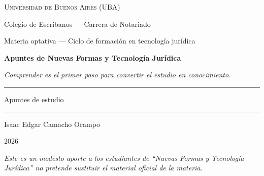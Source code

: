 \documentclass[12pt,oneside]{book}
\newcommand{\universidad}{Universidad de Buenos Aires (UBA)}
\newcommand{\carrera}{Colegio de Escribanos --- Carrera de Notariado}
\newcommand{\materia}{Nuevas Formas y Tecnología Jurídica}
\newcommand{\titulo}{Apuntes de Nuevas Formas y Tecnología Jurídica}
\newcommand{\autor}{Isaac Edgar Camacho Ocampo}
\newcommand{\anio}{2026}
\newcommand{\reflexion}{Comprender es el primer paso para convertir el estudio en conocimiento.}
\begin{document}
\begin{titlepage}

\thispagestyle{empty}

\begin{center}

\vspace*{1cm}

{\large \textsc{\universidad}}

\vspace{0.2cm}

{\large \carrera}

\vspace{0.2cm}

{\normalsize Materia optativa --- Ciclo de formación en tecnología jurídica}

\vspace{3cm}

{\Huge \textbf{\titulo}}

\vspace{1cm}

\textit{\reflexion}

\vspace{1.2cm}

\rule{0.70\textwidth}{0.5pt}

\vspace{0.5cm}

{\large Apuntes de estudio}

\vspace{0.5cm}

\rule{0.70\textwidth}{0.5pt}

\vfill

{\large \autor}

\vspace{0.3cm}

{\large \anio}

\end{center}

\vfill

\begin{flushleft}
\textit{Este es un modesto aporte a los estudiantes de ``\materia'' no pretende sustituir el material oficial de la materia.}
\end{flushleft}

\end{titlepage}

\frontmatter
\tableofcontents
\mainmatter
\end{document}
